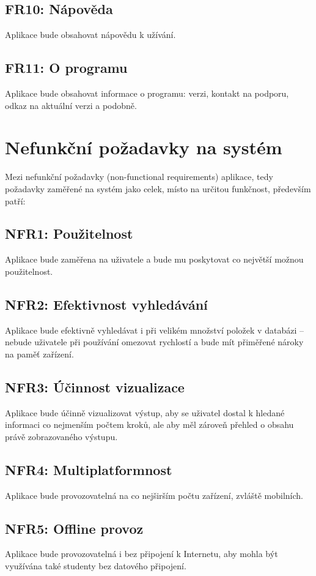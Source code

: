 \subsection{FR10: Nápověda}
Aplikace bude obsahovat nápovědu k užívání.
\subsection{FR11: O programu}
Aplikace bude obsahovat informace o programu: verzi, kontakt na podporu, odkaz na aktuální verzi a podobně.



\section{Nefunkční požadavky na systém}
Mezi nefunkční požadavky  (non-functional requirements) aplikace, tedy požadavky zaměřené na systém jako celek, místo na určitou funkčnost, především patří:
\subsection{NFR1: Použitelnost}
Aplikace bude zaměřena na uživatele a bude mu poskytovat co největší možnou použitelnost.
\subsection{NFR2: Efektivnost vyhledávání}
Aplikace bude efektivně vyhledávat i při velikém množství položek v databázi -- nebude uživatele při používání omezovat rychlostí a bude mít přiměřené nároky na paměť zařízení.
\subsection{NFR3: Účinnost vizualizace}
Aplikace bude účinně vizualizovat výstup, aby se uživatel dostal k hledané informaci co nejmenším počtem kroků, ale aby měl zároveň přehled o obsahu právě zobrazovaného výstupu.
\subsection{NFR4: Multiplatformnost}
Aplikace bude provozovatelná na co nejširším počtu zařízení, zvláště mobilních.
\subsection{NFR5: Offline provoz}
Aplikace bude provozovatelná i bez připojení k Internetu, aby mohla být využívána také studenty bez datového připojení.
